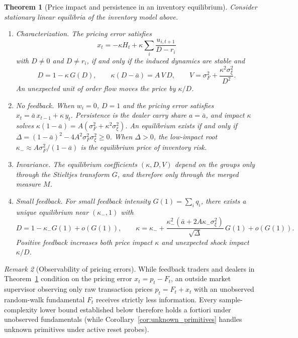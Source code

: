 \documentclass[12pt]{article}
\newtheorem{theorem}{Theorem}[section]
\theoremstyle{definition}
\theoremstyle{remark}
\newtheorem{remark}[theorem]{Remark}
\begin{document}
\begin{theorem}[Price impact and persistence in an inventory equilibrium]\label{n:thm_inventory}
Consider stationary linear equilibria of the inventory model above.
\begin{enumerate}[label=(\roman*),itemsep=1pt]
\item \emph{Characterization.} The pricing error satisfies
\[
 x_t=-\kappa H_t+\kappa\sum_i\frac{u_{i,t+1}}{D-r_i}
\]
with $D\ne0$ and $D\ne r_i$, if and only if the induced dynamics are stable and
\begin{equation}\label{n:eq:inventory_eq}
 D=1-\kappa\,G(D),\qquad \kappa(D-\bar a)=A\,V\,D,\qquad V=\sigma_F^2+\frac{\kappa^2\sigma_\xi^2}{D^2}.
\end{equation}
An unexpected unit of order flow moves the price by $\kappa/D$.
\item \emph{No feedback.} When $w_i=0$, $D=1$ and the pricing error satisfies $x_t=\bar a\,x_{t-1}+\kappa\,y_t$. Persistence is the dealer carry share $a=\bar a$, and impact $\kappa$ solves $\kappa(1-\bar a)=A(\sigma_F^2+\kappa^2\sigma_\xi^2)$. An equilibrium exists if and only if $\Delta=(1-\bar a)^2-4A^2\sigma_F^2\sigma_\xi^2\ge0$. When $\Delta>0$, the low-impact root $\kappa_-\approx A\sigma_F^2/(1-\bar a)$ is the equilibrium price of inventory risk.
\item \emph{Invariance.} The equilibrium coefficients $(\kappa,D,V)$ depend on the groups only through the Stieltjes transform $G$, and therefore only through the merged measure $M$.
\item \emph{Small feedback.} For small feedback intensity $G(1)=\sum_i q_i$, there exists a unique equilibrium near $(\kappa_-,1)$ with
\[
 D=1-\kappa_-G(1)+o(G(1)),\qquad \kappa=\kappa_-+\frac{\kappa_-^2(\bar a+2A\kappa_-\sigma_\xi^2)}{\sqrt\Delta}\,G(1)+o(G(1)).
\]
Positive feedback increases both price impact $\kappa$ and unexpected shock impact $\kappa/D$.
\end{enumerate}
\end{theorem}

\begin{remark}[Observability of pricing errors]\label{n:rem_observability}
While feedback traders and dealers in Theorem~\ref{n:thm_inventory} condition on the pricing error $x_t = p_t - F_t$, an outside market supervisor observing only raw transaction prices $p_t = F_t + x_t$ with an unobserved random-walk fundamental $F_t$ receives strictly less information. Every sample-complexity lower bound established below therefore holds a fortiori under unobserved fundamentals (while Corollary~\ref{cor:unknown_primitives} handles unknown primitives under active reset probes).
\end{remark}
\end{document}
